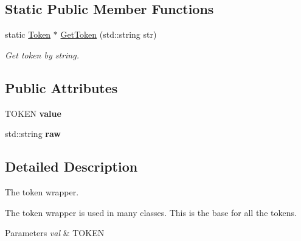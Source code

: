 \subsection*{Static Public Member Functions}
\begin{DoxyCompactItemize}
\item 
static \hyperlink{class_cobra_1_1internal_1_1_token}{Token} $\ast$ \hyperlink{class_cobra_1_1internal_1_1_token_a724ca96f5ae2bd83331e6fc52dc5e3ef}{Get\+Token} (std\+::string str)
\begin{DoxyCompactList}\small\item\em Get token by string. \end{DoxyCompactList}\end{DoxyCompactItemize}
\subsection*{Public Attributes}
\begin{DoxyCompactItemize}
\item 
\hypertarget{class_cobra_1_1internal_1_1_token_adcd2e429ed43b744ab9dd16450408570}{T\+O\+K\+E\+N {\bfseries value}}\label{class_cobra_1_1internal_1_1_token_adcd2e429ed43b744ab9dd16450408570}

\item 
\hypertarget{class_cobra_1_1internal_1_1_token_a7a9397cc323fa7f28fa49783977eb32b}{std\+::string {\bfseries raw}}\label{class_cobra_1_1internal_1_1_token_a7a9397cc323fa7f28fa49783977eb32b}

\end{DoxyCompactItemize}


\subsection{Detailed Description}
The token wrapper. 

The token wrapper is used in many classes. This is the base for all the tokens.


\begin{DoxyParams}{Parameters}
{\em val} & T\+O\+K\+E\+N \\
\hline
\end{DoxyParams}


